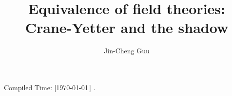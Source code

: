 \title{Equivalence of field theories: Crane-Yetter and the shadow}
\author{Jin-Cheng Guu}
\date{}



\maketitle
\begin{flushright}
  \tiny{Compiled Time: [\today\,\DTMcurrenttime]} \quad\qquad.
\end{flushright}


\tableofcontents

